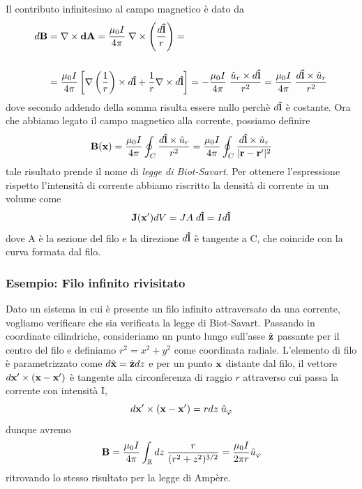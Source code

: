 Il contributo infinitesimo al campo magnetico \`e dato da 
\begin{align*}
	d\bold{B} & = \nabla \times \bold{dA} = \frac{\mu_0I}{4 \pi } \; \nabla \times \left( \frac{d \bold{\hat{l}}}{r}\right)= \\[0.5cm]
	& = \frac{\mu_0 I}{4 \pi} \left [ \nabla \left( \frac{1}{r}\right) \times d\bold{\hat{l}} + \frac{1}{r} \nabla \times d\bold{\hat{l}}\right] = - \frac{\mu_0 I}{4 \pi} \; \frac{\hat{u}_{r} \times d\bold{\hat{l}}}{r^2} = \frac{\mu_0 I}{4 \pi} \; \frac{d \bold{\hat{l}} \times \hat{u}_r}{r^2}
\end{align*}
dove secondo addendo della somma risulta essere nullo perch\`e $d\bold{\hat{l}}$ \`e costante. Ora che abbiamo legato il campo magnetico alla corrente, possiamo definire 
\begin{equation}
	\bold{B}(\bold{x}) = \frac{\mu_0I}{4\pi} \oint_{C} \frac{d \bold{\hat{l}} \times \hat{u}_r}{r^2} = \frac{\mu_0I}{4\pi} \oint_{C} \frac{d \bold{\hat{l}} \times \hat{u}_r}{|\bold{r} -\bold{r}'|^2}
\end{equation}
tale risultato prende il nome di \textit{legge di Biot-Savart}. Per ottenere l'espressione rispetto l'intensit\`a di corrente abbiamo riscritto la densit\`a di corrente in un volume come 
\begin{equation*}
	\bold{J}(\bold{x}')dV = JA \;d\bold{\hat{l}} = Id\bold{\hat{l}}
\end{equation*}
dove A \`e la sezione del filo e la direzione $d \bold{\hat{l}}$ \`e tangente a C, che coincide con la curva formata dal filo.

\subsubsection{Esempio: Filo infinito rivisitato}
Dato un sistema in cui \`e presente un filo infinito attraversato da una corrente, vogliamo verificare che sia verificata la legge di Biot-Savart. Passando in coordinate cilindriche, consideriamo un punto lungo sull'asse $\hat{\bold{z}}$ passante per il centro del filo e definiamo $r^2 = x^2 + y^2$ come coordinata radiale. L'elemento di filo \`e parametrizzato come $d\hat{\bold{x}} = \hat{\bold{z}}dz$ e per un punto $\bold{x}$ distante dal filo, il vettore $d\bold{x}' \times (\bold{x}- \bold{x}')$ \`e tangente alla circonferenza di raggio $r$ attraverso cui passa la corrente con intensit\`a I,
\begin{equation*}
	d\bold{x}' \times (\bold{x} -\bold{x}') = r dz \;\hat{u}_{\varphi} 
\end{equation*}
dunque avremo 
\begin{equation*}
	\bold{B} = \frac{\mu_0I}{4\pi} \int_{\mathbb{R}} dz \; \frac{r}{(r^2+z^2)^{3/2}} = \frac{\mu_0I}{2 \pi r} \hat{u}_{\varphi}
\end{equation*}
ritrovando lo stesso risultato per la legge di Amp\`ere.

